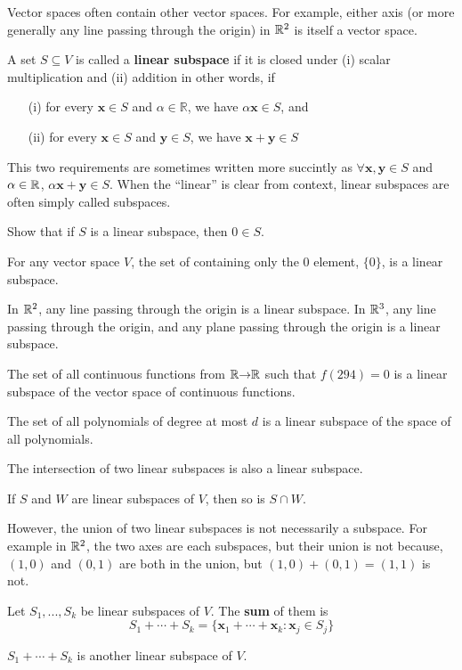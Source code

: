 Vector spaces often contain other vector spaces. For example, either
axis (or more generally any line passing through the origin) in $\mathbb{R}^2$
is itself a vector space.  
\begin{definition}
  A set $S \subseteq V$ is called a \textbf{linear
    subspace} if it is closed under (i) scalar multiplication and (ii)
  addition in other words, if 
  \begin{itemize}
  \item[(i)] for every $\mathbf{x} \in S$ and $\alpha \in \mathbb{R}$,
    we have $\alpha \mathbf{x} \in S$, and
  \item[(ii)] for every $\mathbf{x} \in S$ and $\mathbf{y} \in
    S$, we have
    $\mathbf{x} + \mathbf{y} \in S$
  \end{itemize}
\end{definition}
This two requirements are sometimes written more succintly as $\forall
\mathbf{x}, \mathbf{y} \in S$ and $\alpha \in \mathbb{R}$, $\alpha \mathbf{x}
+ \mathbf{y} \in S$. When the ``linear'' is clear from context, linear
subspaces are often simply called subspaces. 
\begin{exercise}
  Show that if $S$ is a linear subspace, then $0 \in S$. 
\end{exercise}
\begin{example}
  For any vector space $V$, the set of containing only the $0$
  element, $\{0\}$, is a linear subspace.
\end{example}
\begin{example}
  In $\mathbb{R}^2$, any line passing through the origin is a linear subspace.
  In $\mathbb{R}^3$, any line passing through the origin, and any plane
  passing through the origin is a linear subspace.
\end{example}
\begin{example}
  The set of all continuous functions from $\mathbb{R} {\rightarrow} \mathbb{R}$ such that
  $f(294) = 0$ is a linear subspace of the vector space of continuous
  functions. 
\end{example}
\begin{example}
  The set of all polynomials of degree at most $d$ is a linear
  subspace of the space of all polynomials.  
\end{example}

The intersection of two linear subspaces is also a linear subspace.
\begin{example}
  If $S$ and $W$ are linear subspaces of $V$, then so is $S \cap W$.
\end{example}
However, the union of two linear subspaces is not necessarily a
subspace. For example in $\mathbb{R}^2$, the two axes are each subspaces, but
their union is not because, $(1,0)$ and $(0,1)$ are both in the union,
but $(1,0) + (0,1) = (1,1)$ is not. 
\begin{definition}
  Let $S_1, ..., S_k$ be linear subspaces of $V$. The \textbf{sum} of
  them is
  \[ S_1 + \cdots + S_k = \{ \mathbf{x}_1 + \cdots + \mathbf{x}_k :
  \mathbf{x}_j \in S_j \} \]
\end{definition}
$S_1 + \cdots + S_k$ is another linear subspace of $V$. 

